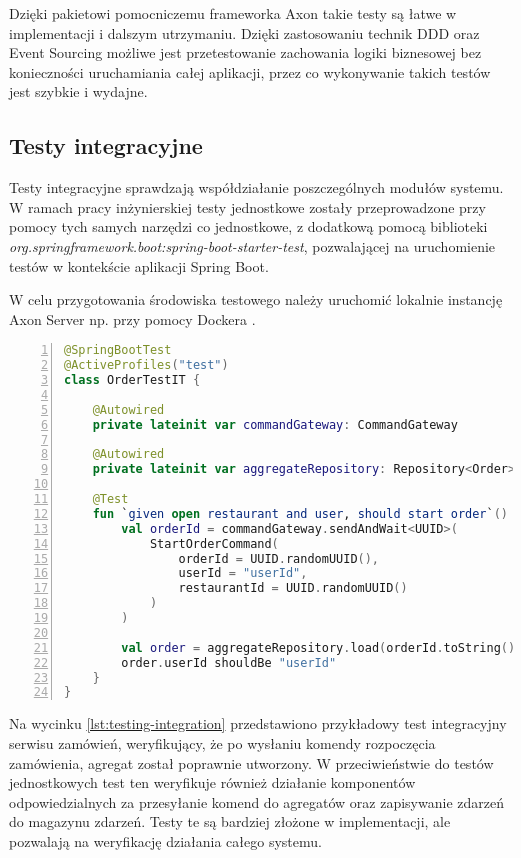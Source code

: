 Dzięki pakietowi pomocniczemu frameworka Axon takie testy są łatwe w implementacji i dalszym utrzymaniu. Dzięki zastosowaniu technik DDD oraz Event Sourcing możliwe jest przetestowanie zachowania logiki biznesowej bez konieczności uruchamiania całej aplikacji, przez co wykonywanie takich testów jest szybkie i wydajne.

\subsection{Testy integracyjne}

Testy integracyjne sprawdzają współdziałanie poszczególnych modułów systemu. W ramach pracy inżynierskiej testy jednostkowe zostały przeprowadzone przy pomocy tych samych narzędzi co jednostkowe, z dodatkową pomocą biblioteki \linebreak \textit{org.springframework.boot:spring-boot-starter-test}, pozwalającej na uruchomienie testów w kontekście aplikacji Spring Boot.

W celu przygotowania środowiska testowego należy uruchomić lokalnie instancję Axon Server np. przy pomocy Dockera \cite{docker}.

\begin{lstlisting}[caption={Przykładowy test integracyjny serwisu zamówień},label={lst:testing-integration},captionpos=b,language=Kotlin,numbers=left]
@SpringBootTest
@ActiveProfiles("test")
class OrderTestIT {

    @Autowired
    private lateinit var commandGateway: CommandGateway

    @Autowired
    private lateinit var aggregateRepository: Repository<Order>

    @Test
    fun `given open restaurant and user, should start order`() {
        val orderId = commandGateway.sendAndWait<UUID>(
            StartOrderCommand(
                orderId = UUID.randomUUID(),
                userId = "userId",
                restaurantId = UUID.randomUUID()
            )
        )

        val order = aggregateRepository.load(orderId.toString())
        order.userId shouldBe "userId"
    }
}
\end{lstlisting}

Na wycinku \ref{lst:testing-integration} przedstawiono przykładowy test integracyjny serwisu zamówień, weryfikujący, że po wysłaniu komendy rozpoczęcia zamówienia, agregat został poprawnie utworzony. W przeciwieństwie do testów jednostkowych test ten weryfikuje również działanie komponentów odpowiedzialnych za przesyłanie komend do agregatów oraz zapisywanie zdarzeń do magazynu zdarzeń. Testy te są bardziej złożone w implementacji, ale pozwalają na weryfikację działania całego systemu.

